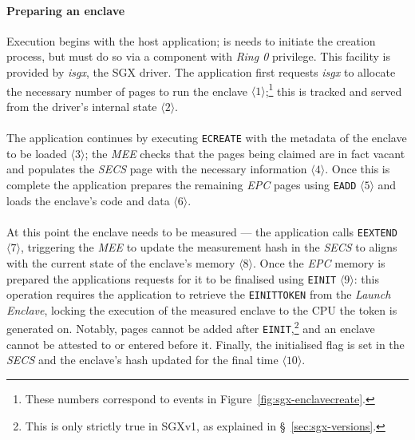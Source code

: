\paragraph{Preparing an enclave} Execution begins with the host application; is needs to initiate the creation process, but must do so via a component with \textit{Ring 0} privilege. This facility is provided by \textit{isgx}, the SGX driver. The application first requests \textit{isgx} to allocate the necessary number of pages to run the enclave $\langle 1 \rangle$;\footnote{These numbers correspond to events in Figure~\ref{fig:sgx-enclavecreate}.} this is tracked and served from the driver's internal state $\langle 2 \rangle$.

\paragraph{} The application continues by executing \texttt{ECREATE} with the metadata of the enclave to be loaded $\langle 3 \rangle$; the \textit{MEE} checks that the pages being claimed are in fact vacant and populates the \textit{SECS} page with the necessary information $\langle 4 \rangle$. Once this is complete the application prepares the remaining \textit{EPC} pages using \texttt{EADD} $\langle 5 \rangle$ and loads the enclave's code and data $\langle 6 \rangle$.

\paragraph{} At this point the enclave needs to be measured --- the application calls \texttt{EEXTEND} $\langle 7 \rangle$, triggering the \textit{MEE} to update the measurement hash in the \textit{SECS} to aligns with the current state of the enclave's memory $\langle 8 \rangle$. Once the \textit{EPC} memory is prepared the applications requests for it to be finalised using \texttt{EINIT} $\langle 9 \rangle$: this operation requires the application to retrieve the \texttt{EINITTOKEN} from the \textit{Launch Enclave}, locking the execution of the measured enclave to the CPU the token is generated on. Notably, pages cannot be added after \texttt{EINIT},\footnote{This is only strictly true in SGXv1, as explained in §~\ref{sec:sgx-versions}.} and an enclave cannot be attested to or entered before it. Finally, the initialised flag is set in the \textit{SECS} and the enclave's hash updated for the final time $\langle 10 \rangle$.


